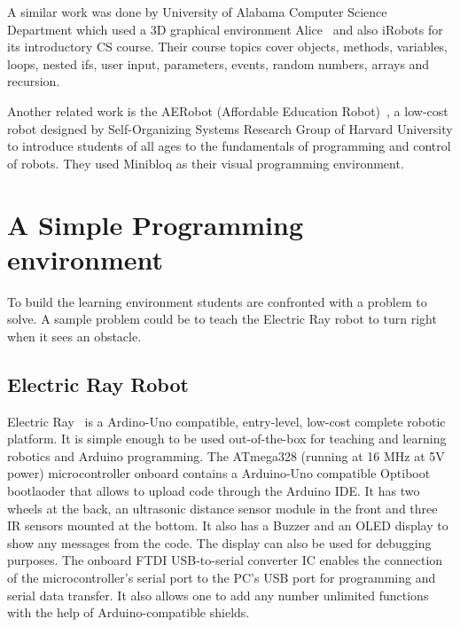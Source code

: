 \documentclass[conference]{IEEEtran}
\begin{document}
A similar work was done by University of Alabama Computer Science Department which used a 3D graphical environment Alice~\cite{alice} and also iRobots for its introductory CS course. Their course topics cover objects, methods, variables, loops, nested ifs, user input, parameters, events, random numbers, arrays and recursion. 

Another related work is the AERobot (Affordable Education Robot)~\cite{aerobot}, a low-cost robot designed by Self-Organizing Systems Research Group of Harvard University to introduce students of all ages to the fundamentals of programming and control of robots. They used Minibloq as their visual programming environment.

\section{A Simple Programming environment}

To build the learning environment students are confronted with a problem to solve. A sample problem could be to teach the Electric Ray robot to turn right when it sees an obstacle.

\subsection{Electric Ray Robot}

Electric Ray~\cite{eray} is a Ardino-Uno compatible, entry-level, low-cost complete robotic platform. It is simple enough to be used out-of-the-box for teaching and learning  robotics and Arduino programming.  The ATmega328 (running at 16 MHz at 5V power) microcontroller onboard contains a Arduino-Uno compatible Optiboot bootlaoder that allows to upload code through the Arduino IDE. It has two wheels at the back, an ultrasonic distance sensor module in the front and three IR sensors mounted at the bottom. It also has a Buzzer and an OLED display to show any messages from the code. The display can also be used for debugging purposes. The onboard FTDI USB-to-serial converter IC enables the connection of the microcontroller's serial port to the PC's USB port for programming and serial data transfer.  It also allows one to add any number unlimited functions with the help of Arduino-compatible shields.
\end{document}
